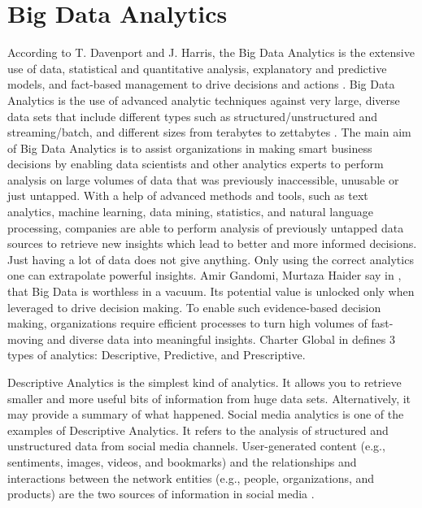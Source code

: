 \documentclass[runningheads]{llncs}
\begin{document}
\section{Big Data Analytics}
According to T. Davenport and J. Harris, the Big Data Analytics is the extensive use of data, statistical and quantitative analysis, explanatory and predictive models, and fact-based management to drive decisions and actions \cite{DAVBOOK}. Big Data Analytics is the use of advanced analytic techniques against very large, diverse data sets that include different types such as structured/unstructured and streaming/batch, and different sizes from terabytes to zettabytes \cite{IBM}. The main aim of Big Data Analytics is to assist organizations in making smart business decisions by enabling data scientists and other analytics experts to perform analysis on large volumes of data that  was previously inaccessible, unusable or just untapped.  With a help of advanced methods and tools, such as text analytics, machine learning, data mining, statistics, and natural language processing, companies are able to perform analysis of previously untapped data sources to retrieve new insights which lead to better and more informed decisions. Just having a lot of data does not give anything. Only using the correct analytics one can extrapolate powerful insights. Amir Gandomi, Murtaza Haider say in \cite{ELS}, that Big Data is worthless in a vacuum. Its potential value is unlocked only when leveraged to drive decision making. To enable such evidence-based decision making, organizations require efficient processes to turn high volumes of fast-moving and diverse data into meaningful insights. Charter Global in \cite{CHARTER} defines 3 types of analytics: Descriptive, Predictive, and Prescriptive. 

Descriptive Analytics is the simplest kind of analytics. It allows you to retrieve smaller and more useful bits of information from huge data sets. Alternatively, it may provide a summary of what happened. Social media analytics is one of the examples of Descriptive Analytics. It refers to the analysis of structured and unstructured data from social media channels. User-generated content (e.g., sentiments, images, videos, and bookmarks) and the relationships and interactions between the network entities (e.g., people, organizations, and products) are the two sources of information in social media \cite{ELS}. 
\end{document}
